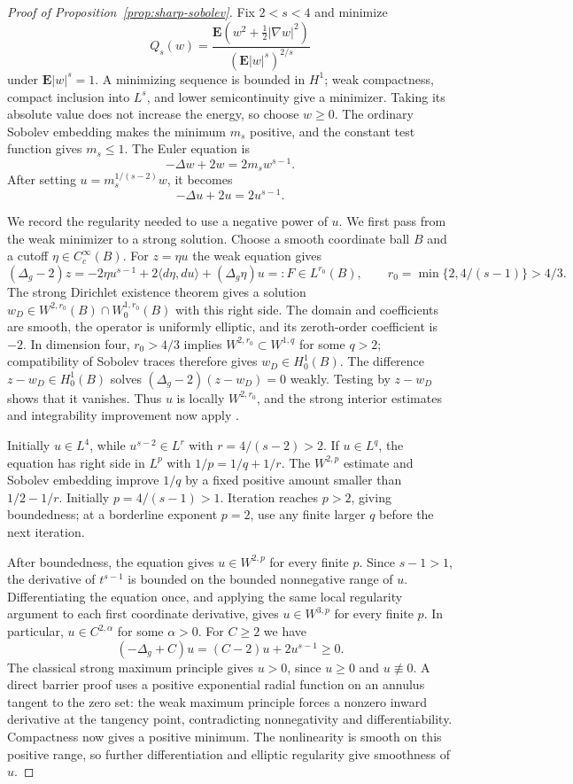 \begin{proof}[Proof of Proposition~\ref{prop:sharp-sobolev}]
Fix $2<s<4$ and minimize
\[
 Q_s(w)=
 \frac{\mathbf E(w^2+\tfrac12|\nabla w|^2)}
      {(\mathbf E|w|^s)^{2/s}}
\]
under $\mathbf E|w|^s=1$. A minimizing sequence is bounded in
$H^1$; weak compactness, compact inclusion into $L^s$, and lower
semicontinuity give a minimizer. Taking its absolute value does
not increase the energy, so choose $w\ge0$.
The ordinary Sobolev embedding makes the minimum $m_s$ positive,
and the constant test function gives $m_s\le1$.
The Euler equation is
\[
 -\Delta w+2w=2m_s w^{s-1}.
\]
After setting $u=m_s^{1/(s-2)}w$, it becomes
\[
 -\Delta u+2u=2u^{s-1}.
\]

We record the regularity needed to use a negative power of $u$.
We first pass from the weak minimizer to a strong solution. Choose a
smooth coordinate ball $B$ and a cutoff $\eta\in C_c^\infty(B)$.
For $z=\eta u$ the weak equation gives
\[
 (\Delta_g-2)z
 =-2\eta u^{s-1}+2\langle d\eta,du\rangle+(\Delta_g\eta)u
 =:F\in L^{r_0}(B),
 \qquad r_0=\min\{2,4/(s-1)\}>4/3.
\]
The strong Dirichlet existence theorem
\cite[Theorem~9.15]{GilbargTrudinger} gives a solution
$w_D\in W^{2,r_0}(B)\cap W^{1,r_0}_0(B)$ with this right side.
The domain and coefficients are smooth, the operator is uniformly
elliptic, and its zeroth-order coefficient is $-2$.
In dimension four, $r_0>4/3$ implies
$W^{2,r_0}\subset W^{1,q}$ for some $q>2$; compatibility of Sobolev
traces therefore gives $w_D\in H^1_0(B)$.
The difference $z-w_D\in H^1_0(B)$ solves
$(\Delta_g-2)(z-w_D)=0$ weakly. Testing by $z-w_D$ shows that it
vanishes. Thus $u$ is locally $W^{2,r_0}$, and the strong interior
estimates and integrability improvement now apply
\cite[Theorem~9.11 and Lemma~9.16]{GilbargTrudinger}.

Initially $u\in L^4$, while $u^{s-2}\in L^r$ with
$r=4/(s-2)>2$. If $u\in L^q$, the equation has right side in
$L^p$ with $1/p=1/q+1/r$. The $W^{2,p}$ estimate and Sobolev
embedding improve $1/q$ by a fixed positive amount smaller than
$1/2-1/r$. Initially $p=4/(s-1)>1$. Iteration reaches $p>2$,
giving boundedness; at a borderline exponent $p=2$, use any
finite larger $q$ before the next iteration.

After boundedness, the equation gives $u\in W^{2,p}$ for every finite
$p$. Since $s-1>1$, the derivative of $t^{s-1}$ is bounded on the
bounded nonnegative range of $u$. Differentiating the equation once,
and applying the same local regularity argument to each first
coordinate derivative, gives $u\in W^{3,p}$ for every finite $p$.
In particular, $u\in C^{2,\alpha}$ for some $\alpha>0$.
For $C\ge2$ we have
\[
 (-\Delta_g+C)u=(C-2)u+2u^{s-1}\ge0.
\]
The classical strong maximum principle gives $u>0$, since
$u\ge0$ and $u\not\equiv0$. A direct barrier proof uses a positive
exponential radial function on an annulus tangent to the zero set:
the weak maximum principle forces a nonzero inward derivative at the
tangency point, contradicting nonnegativity and differentiability.
Compactness now gives a positive minimum. The nonlinearity is smooth
on this positive range, so further differentiation and elliptic
regularity give smoothness of $u$.


\end{proof}
